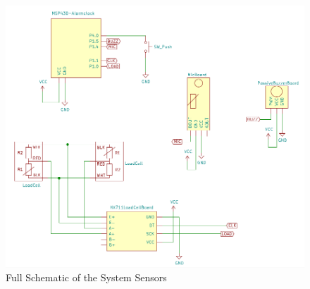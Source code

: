 \documentclass[11pt]{article}
\begin{document}
\begin{figure}[H]
	\centering
	\includegraphics[width = 0.8\linewidth]{fullscem}
	\caption{Full Schematic of the System Sensors}
	\label{fig:fullCircuit}
\end{figure}
\end{document}
